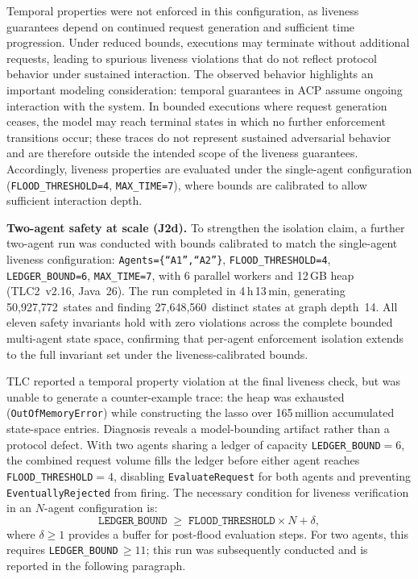 \documentclass[11pt]{article}
\theoremstyle{definition}
\begin{document}
Temporal properties were not enforced in this configuration, as liveness guarantees
depend on continued request generation and sufficient time progression.
Under reduced bounds, executions may terminate without additional requests, leading
to spurious liveness violations that do not reflect protocol behavior under sustained
interaction.
The observed behavior highlights an important modeling consideration:
temporal guarantees in ACP assume ongoing interaction with the system.
In bounded executions where request generation ceases, the model may reach terminal
states in which no further enforcement transitions occur; these traces do not represent
sustained adversarial behavior and are therefore outside the intended scope of the
liveness guarantees.
Accordingly, liveness properties are evaluated under the single-agent configuration
(\texttt{FLOOD\_THRESHOLD=4}, \texttt{MAX\_TIME=7}), where bounds are calibrated to
allow sufficient interaction depth.

\smallskip
\noindent\textbf{Two-agent safety at scale (J2d).}
To strengthen the isolation claim, a further two-agent run was conducted
with bounds calibrated to match the single-agent liveness configuration:
\texttt{Agents=\{``A1'',``A2''\}}, \texttt{FLOOD\_THRESHOLD=4},
\texttt{LEDGER\_BOUND=6}, \texttt{MAX\_TIME=7},
with 6 parallel workers and 12\,GB heap (TLC2~v2.16, Java~26).
The run completed in 4\,h\,13\,min, generating 50,927,772~states
and finding 27,648,560~distinct states at graph depth~14.
All eleven safety invariants hold with zero violations across the complete
bounded multi-agent state space, confirming that per-agent enforcement
isolation extends to the full invariant set under the liveness-calibrated bounds.

TLC reported a temporal property violation at the final liveness check,
but was unable to generate a counter-example trace:
the heap was exhausted (\texttt{OutOfMemoryError}) while constructing the lasso
over 165\,million accumulated state-space entries.
Diagnosis reveals a model-bounding artifact rather than a protocol defect.
With two agents sharing a ledger of capacity \texttt{LEDGER\_BOUND}$=6$,
the combined request volume fills the ledger before either agent reaches
\texttt{FLOOD\_THRESHOLD}$=4$, disabling \texttt{EvaluateRequest} for both
agents and preventing \texttt{EventuallyRejected} from firing.
The necessary condition for liveness verification in an $N$-agent configuration is:
\[
  \texttt{LEDGER\_BOUND} \;\geq\; \texttt{FLOOD\_THRESHOLD} \times N + \delta,
\]
where $\delta \geq 1$ provides a buffer for post-flood evaluation steps.
For two agents, this requires \texttt{LEDGER\_BOUND}$\,\geq 11$; this run
was subsequently conducted and is reported in the following paragraph.
\end{document}
